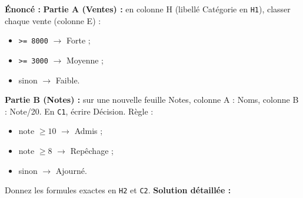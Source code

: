\documentclass[11pt]{article}
\begin{document}
\begin{exoresolu}
\textbf{Énoncé :}
\textbf{Partie A (Ventes) :} en colonne H (libellé \og{}Catégorie\fg{} en \texttt{H1}), classer chaque vente (colonne E) :
\begin{itemize}
    \item \texttt{>= 8000} $\rightarrow$ \og{}Forte\fg{} ;
    \item \texttt{>= 3000} $\rightarrow$ \og{}Moyenne\fg{} ;
    \item sinon $\rightarrow$ \og{}Faible\fg{}.
\end{itemize}
\textbf{Partie B (Notes) :} sur une nouvelle feuille \og{}Notes\fg{}, colonne A : Noms, colonne B : Note/20. En \texttt{C1}, écrire \og{}Décision\fg{}. Règle :
\begin{itemize}
    \item note $\ge 10$ $\rightarrow$ \og{}Admis\fg{} ;
    \item note $\ge 8$ $\rightarrow$ \og{}Repêchage\fg{} ;
    \item sinon $\rightarrow$ \og{}Ajourné\fg{}.
\end{itemize}
Donnez les formules exactes en \texttt{H2} et \texttt{C2}.
\tcblower
\textbf{Solution détaillée :}


\end{exoresolu}
\end{document}
